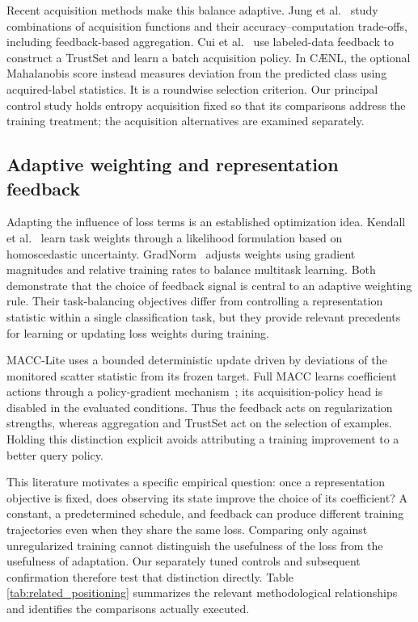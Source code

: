 \documentclass[10pt,a4paper,twocolumn]{article}
\newcommand{\model}{C\AE{}NL}
\begin{document}
Recent acquisition methods make this balance adaptive. Jung et
al.~\cite{jung2026aggregation} study combinations of acquisition
functions and their accuracy--computation trade-offs, including
feedback-based aggregation. Cui et al.~\cite{cui2026trustset} use
labeled-data feedback to construct a TrustSet and learn a batch
acquisition policy. In \model{}, the optional Mahalanobis score instead
measures deviation from the predicted class using acquired-label
statistics. It is a roundwise selection criterion. Our principal
control study holds entropy acquisition fixed so that its comparisons
address the training treatment; the acquisition alternatives are
examined separately.

\subsection{Adaptive weighting and representation feedback}
\label{sec:related_control}

Adapting the influence of loss terms is an established optimization
idea. Kendall et al.~\cite{kendall2018uncertainty} learn task weights
through a likelihood formulation based on homoscedastic uncertainty.
GradNorm~\cite{chen2018gradnorm} adjusts weights using gradient
magnitudes and relative training rates to balance multitask learning.
Both demonstrate that the choice of feedback signal is central to an
adaptive weighting rule. Their task-balancing objectives differ from
controlling a representation statistic within a single classification
task, but they provide relevant precedents for learning or updating
loss weights during training.

MACC-Lite uses a bounded deterministic update driven by deviations of
the monitored scatter statistic from its frozen target. Full MACC
learns coefficient actions through a policy-gradient
mechanism~\cite{williams1992}; its acquisition-policy head is disabled
in the evaluated conditions. Thus the feedback acts on regularization
strengths, whereas aggregation and TrustSet act on the selection of
examples. Holding this distinction explicit avoids attributing a
training improvement to a better query policy.

This literature motivates a specific empirical question: once a
representation objective is fixed, does observing its state improve
the choice of its coefficient? A constant, a predetermined schedule,
and feedback can produce different training trajectories even when
they share the same loss. Comparing only against unregularized
training cannot distinguish the usefulness of the loss from the
usefulness of adaptation. Our separately tuned controls and subsequent
confirmation therefore test that distinction directly. Table~
\ref{tab:related_positioning} summarizes the relevant methodological
relationships and identifies the comparisons actually executed.
\end{document}
